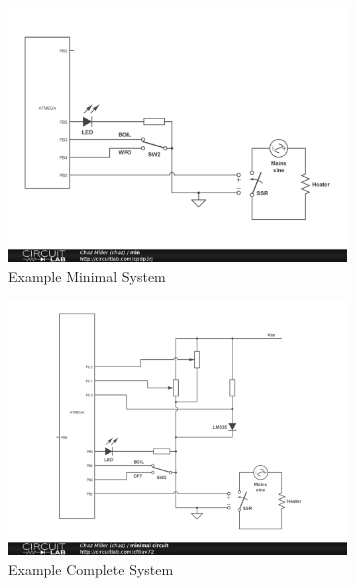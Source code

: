 \documentclass[dvips,12pt]{article}
\begin{document}
\begin{figure}[h]
    \begin{centering}
    \includegraphics[width=0.8\textwidth]{min}
    \caption{Example Minimal System}
    \label{fig:min}
    \end{centering}
\end{figure}


\begin{figure}[h]
    \begin{centering}
    \includegraphics[width=0.8\textwidth]{max}
    \caption{Example Complete System} 
    \label{fig:max}
    \end{centering}
\end{figure}
\end{document}
